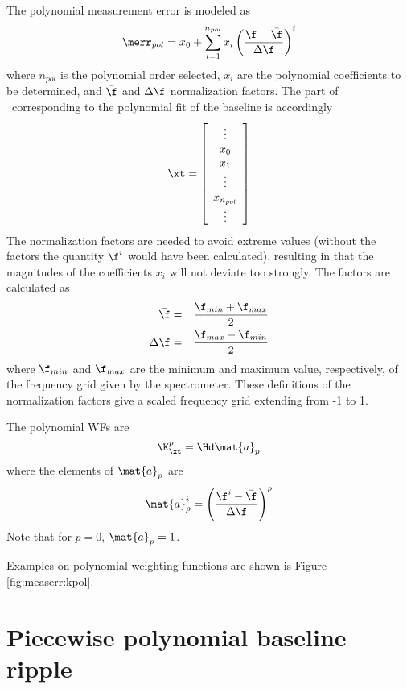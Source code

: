  The polynomial measurement error is modeled as
 \begin{equation}
   \merr_{pol} = x_0 + \sum_{i=1}^{n_{pol}} x_i \left( 
                      \frac{\f-\bar{\f}}{\Delta \f} \right)^i
 \end{equation}
 where $n_{pol}$ is the polynomial order selected, $x_i$ are the 
 polynomial coefficients to be determined, and $\bar{\f}$ and
 $\Delta \f$ normalization factors. The part of \xt\ corresponding
 to the polynomial fit of the baseline is accordingly
 \begin{equation}
   \xt = \left[ \begin{array}{c} \vdots \\ x_0\\ x_1 \\ \vdots \\ x_{n_{pol}} \\ \vdots \end{array} \right]
 \end{equation}
 The normalization factors are needed to avoid extreme values (without
 the factors the quantity $\f^i$ would have been calculated),
 resulting in that the magnitudes of the coefficients $x_i$ will not
 deviate too strongly. The factors are calculated as
 \begin{eqnarray}
   \bar{\f} &=& \frac{\f_{min}+\f_{max}}{2} \\
   \label{eq:measerr:fmean}
   \Delta \f &=& \frac{\f_{max}-\f_{min}}{2}
 \end{eqnarray}
 where $\f_{min}$ and $\f_{max}$ are the minimum and maximum value,
 respectively, of the frequency grid given by the spectrometer. These
 definitions of the normalization factors give a scaled frequency grid
 extending from -1 to 1.

 The polynomial WFs are
 \begin{equation}
   \K_{\xt}^p = \Hd \mat{a}_p
 \end{equation}
 where the elements of $\mat{a}_p$ are
 \begin{equation}
   \mat{a}_p^i = \left( \frac{\f^i-\bar{\f}}{\Delta \f} \right)^p
  \label{eq:measerr:kpol}
 \end{equation}
 Note that for $p=0$, $\mat{a}_p=1$. 
 
 Examples on polynomial weighting functions are shown is Figure 
 \ref{fig:measerr:kpol}.



\section{Piecewise polynomial baseline ripple}
 \label{sec:measerr:ppol}
 
